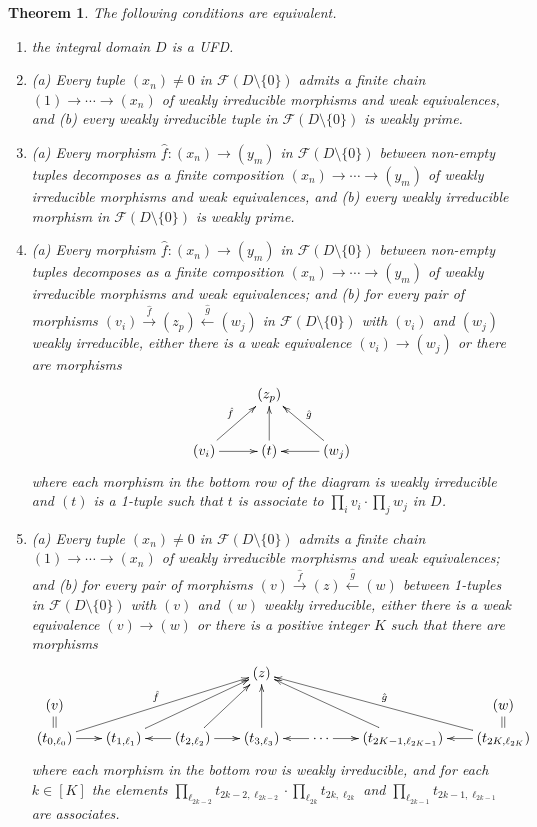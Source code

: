 \documentclass[reqno]{amsart}
\theoremstyle{plain}
\newtheorem{thm}[lem]{Theorem}
\theoremstyle{definition}
\newcommand{\cat}[1]{\mathcal{#1}}
\newcommand{\catf}{\cat{F}}
\newcommand{\xra}{\xrightarrow}
\newcommand{\xla}{\xleftarrow}
\newcommand{\emptytuple}{\mathfrak{0}}
\numberwithin{equation}{lem}
\begin{document}
\begin{thm}\label{prop170710a}
The following conditions are equivalent.
\begin{enumerate}[\rm(i)]
\item\label{prop170710a1}
the 
integral
domain $D$ is a UFD.
\item\label{prop170710a2}
\emph{(a)} Every
tuple $(x_n)\neq\emptytuple$ in $\catf(D \setminus \{0\})$ admits a finite chain
$(1)\to\cdots\to(x_n)$ of 
weakly
irreducible morphisms and weak equivalences, and
\emph{(b)}
every 
weakly
irreducible tuple in $\catf(D \setminus \{0\})$ is 
weakly
prime.
\item\label{prop170710a3}
\emph{(a)} Every
morphism $\hat f\colon (x_n)\to(y_m)$ in $\catf(D \setminus \{0\})$ between non-empty tuples decomposes as a finite composition
$(x_n)\to\cdots\to(y_m)$ of 
weakly
irreducible morphisms and weak equivalences, and
\emph{(b)}
every 
weakly
irreducible morphism  in $\catf(D \setminus \{0\})$ is 
weakly
prime.
\item\label{prop170710a5}
\emph{(a)} Every morphism $\hat f\colon (x_n)\to(y_m)$ in $\catf(D \setminus \{0\})$ between non-empty tuples decomposes 
as a finite composition
$(x_n)\to\cdots\to(y_m)$ of 
weakly
irreducible morphisms and weak equivalences; and
\emph{(b)} for every pair of morphisms $(v_i)\xra{\hat f}(z_p)\xla{\hat g}(w_j)$ in $\catf(D\setminus\{0\})$ with $(v_i)$ and $(w_j)$ 
weakly
irreducible,
either there is a weak equivalence $(v_i)\to(w_j)$ or 
there  are morphisms
\begin{equation}
\label{eq170719a}
\begin{split}
\xymatrix{
&(z_p)
\\
(v_i)\ar[r]\ar[ru]^{\hat f}
&(t)\ar[u]
&(w_j)\ar[l]\ar[lu]_{\hat g}
}
\end{split}
\end{equation}
where each morphism in the bottom row of the diagram is 
weakly
irreducible and $(t)$ is a 1-tuple
such that $t$ is associate to $\prod_iv_i\cdot\prod_jw_j$ in $D$.
\item\label{prop170710a4}
\emph{(a)} Every tuple $(x_n)\neq\emptytuple$ in $\catf(D \setminus \{0\})$ admits a finite chain
$(1)\to\cdots\to(x_n)$ of 
weakly
irreducible morphisms and weak equivalences; and
\emph{(b)} for every pair of morphisms $(v)\xra{\hat f}(z)\xla{\hat g}(w)$ between 1-tuples in $\catf(D\setminus\{0\})$ with $(v)$ and $(w)$ 
weakly
irreducible,
either there is a weak equivalence $(v)\to(w)$ or 
there is a positive integer $K$ such that there are morphisms
$$\xymatrix@C=6.3mm@R=2.5mm{
&&&(z)
\\ 
(v)&&&&&&(w)
\\
(t_{0,\ell_0})\ar[r]\ar[rrruu]^{\hat f}
\ar@{=}[u]
&(t_{1,\ell_1})\ar[rruu]
&(t_{2,\ell_2})\ar[r]\ar[l]\ar[ruu]
&(t_{3,\ell_3})\ar[uu]
&\cdots\ar[r]\ar[l]
&(t_{2K-1,\ell_{2K-1}})\ar[lluu]
&(t_{2K,\ell_{2K}})\ar[l]\ar[llluu]_{\hat g}\ar@{=}[u]
}$$
where each morphism in the bottom row is 
weakly
irreducible, and
for each $k\in [K]$ 
the elements $\prod_{\ell_{2k-2}}t_{2k-2,\ell_{2k-2}}\cdot\prod_{\ell_{2k}}t_{2k,\ell_{2k}}$ and
$\prod_{\ell_{2k-1}}t_{2k-1,\ell_{2k-1}}$ are associates.
\end{enumerate}
\end{thm}
\end{document}
